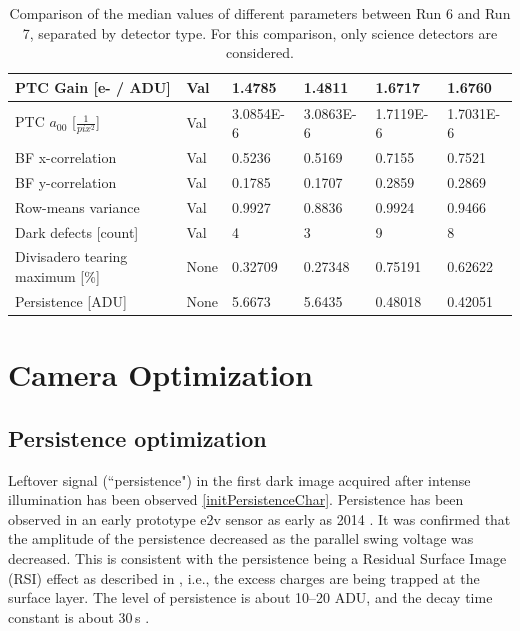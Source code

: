 \begin{table}[ht]
{\begin{tabular}{|l|l|ll|ll|}
PTC Gain {[}e- / ADU{]}            & Val               & \multicolumn{1}{l|}{1.4785}    & 1.4811    & \multicolumn{1}{l|}{1.6717}    & 1.6760     \\ \hline
PTC $a_{00}$ [$\frac{1}{pix^2}$]   & Val               & \multicolumn{1}{l|}{3.0854E-6} & 3.0863E-6 & \multicolumn{1}{l|}{1.7119E-6} & 1.7031E-6  \\ \hline
BF x-correlation                   & Val               & \multicolumn{1}{l|}{0.5236}    & 0.5169    & \multicolumn{1}{l|}{0.7155}    & 0.7521     \\ \hline
BF y-correlation                   & Val               & \multicolumn{1}{l|}{0.1785}    & 0.1707    & \multicolumn{1}{l|}{0.2859}    & 0.2869     \\ \hline
Row-means variance                 & Val               & \multicolumn{1}{l|}{0.9927}    & 0.8836    & \multicolumn{1}{l|}{0.9924}    & 0.9466     \\ \hline
Dark defects {[}count{]}           & Val               & \multicolumn{1}{l|}{4} & 3 & \multicolumn{1}{l|}{9} & 8  \\ \hline
Divisadero tearing maximum {[}\%{]}& None               & \multicolumn{1}{l|}{0.32709}   & 0.27348   & \multicolumn{1}{l|}{0.75191}   & 0.62622    \\ \hline
Persistence {[}ADU{]}              & None               & \multicolumn{1}{l|}{5.6673}    & 5.6435    & \multicolumn{1}{l|}{0.48018}   & 0.42051    \\ \hline
\end{tabular}
}
\caption{Comparison of the median values of different parameters between Run 6 and Run 7, separated by detector type. For this comparison, only science detectors are considered.}
\end{table}


\section{Camera Optimization}\label{sec:camera-optimization}

\subsection{Persistence optimization}\label{sec:persistence-optimization}


Leftover signal (``persistence") in the first dark image acquired after intense illumination has
been observed \ref{initPersistenceChar}.  Persistence has been observed
in an early prototype e2v sensor as early as 2014
\citep{2014SPIE.9154E..18D}. It was confirmed that the amplitude of
the persistence decreased as the parallel swing voltage was decreased.
This is consistent with the persistence being a Residual Surface Image (RSI) effect as described in
\citep{2001sccd.book.....J}, i.e., the excess charges are being trapped
at the surface layer. The level of persistence is about 10--20 ADU,
and the decay time constant is about 30\,s
\citep{dmtn-276}.

